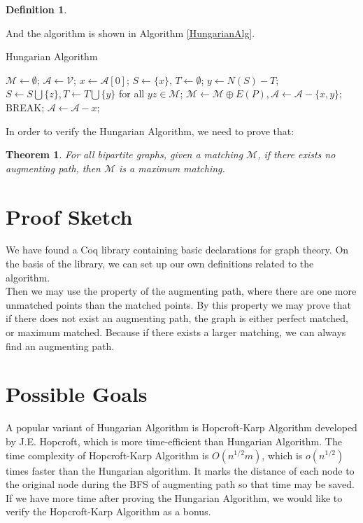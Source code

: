 \documentclass{paper}
\newtheorem{definition}{Definition}
\newtheorem{theorem}{Theorem}
\begin{document}
\begin{spacing}{1.2}
\begin{definition}
    \end{definition}
    And the algorithm is shown in Algorithm \ref{HungarianAlg}.
    \begin{algorithm}
        \caption{Hungarian Algorithm}
        \label{HungarianAlg}
        \begin{algorithmic}
            \STATE $\mathcal{M}\gets\emptyset$;
            \STATE $\mathcal{A}\gets\mathcal{V}$;
            \REPEAT
                \STATE $x\gets\mathcal{A}[0]$;
                \STATE $S\gets\{x\}$, $T\gets\emptyset$;
                    \STATE $y\gets N(S)-T$;
                        \STATE $S\gets S\bigcup\{z\}, T\gets T\bigcup\{y\}$ for all $yz\in \mathcal{M}$;
                    \ELSE
                        \STATE $\mathcal{M}\gets \mathcal{M}\oplus E(P), \mathcal{A}\gets\mathcal{A}-\{x, y\}$;
                        \STATE BREAK;
                    \ENDIF
                \ENDWHILE
                \STATE $\mathcal{A}\gets\mathcal{A}-x$;
        \end{algorithmic}
    \end{algorithm}
    In order to verify the Hungarian Algorithm, we need to prove that:
    \begin{theorem}
        For all bipartite graphs, given a matching $\mathcal{M}$, if there exists no augmenting path, then $\mathcal{M}$ is a maximum matching.    
    \end{theorem}
\section{Proof Sketch}
    We have found a Coq library containing basic declarations for graph theory\cite{github}. On the basis of the library, we can set up our own definitions related to the algorithm. \\
    Then we may use the property of the augmenting path, where there are one more unmatched points than the matched points. By this property we may prove that if there does not exist an augmenting path, the graph is either perfect matched, or maximum matched. Because if there exists a larger matching, we can always find an augmenting path.
\section{Possible Goals}
    A popular variant of Hungarian Algorithm is Hopcroft-Karp Algorithm \cite{Hopcroft} developed by J.E. Hopcroft, which is more time-efficient than Hungarian Algorithm. The time complexity of Hopcroft-Karp Algorithm is $O(n^{1/2}m)$, which is $o(n^{1/2})$ times faster than the Hungarian algorithm. It marks the distance of each node to the original node during the BFS of augmenting path so that time may be saved. If we have more time after proving the Hungarian Algorithm, we would like to verify the Hopcroft-Karp Algorithm as a bonus.
\end{spacing}



\end{document}
